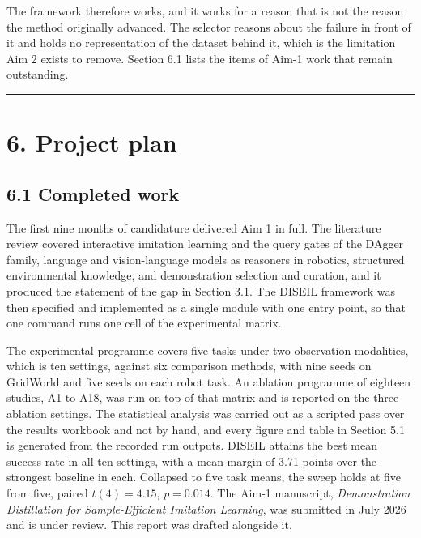 \documentclass[
  11pt,
]{article}
\begin{document}
The framework therefore works, and it works for a reason that is not the
reason the method originally advanced. The selector reasons about the
failure in front of it and holds no representation of the dataset behind
it, which is the limitation Aim 2 exists to remove. Section 6.1 lists
the items of Aim-1 work that remain outstanding.

\begin{center}\rule{0.5\linewidth}{0.5pt}\end{center}

\hypertarget{project-plan}{%
\section{6. Project plan}\label{project-plan}}

\hypertarget{completed-work}{%
\subsection{6.1 Completed work}\label{completed-work}}

The first nine months of candidature delivered Aim 1 in full. The
literature review covered interactive imitation learning and the query
gates of the DAgger family, language and vision-language models as
reasoners in robotics, structured environmental knowledge, and
demonstration selection and curation, and it produced the statement of
the gap in Section 3.1. The DISEIL framework was then specified and
implemented as a single module with one entry point, so that one command
runs one cell of the experimental matrix.

The experimental programme covers five tasks under two observation
modalities, which is ten settings, against six comparison methods, with
nine seeds on GridWorld and five seeds on each robot task. An ablation
programme of eighteen studies, A1 to A18, was run on top of that matrix
and is reported on the three ablation settings. The statistical analysis
was carried out as a scripted pass over the results workbook and not by
hand, and every figure and table in Section 5.1 is generated from the
recorded run outputs. DISEIL attains the best mean success rate in all
ten settings, with a mean margin of 3.71 points over the strongest
baseline in each. Collapsed to five task means, the sweep holds at five
from five, paired \(t(4) = 4.15\), \(p = 0.014\). The Aim-1 manuscript,
\emph{Demonstration Distillation for Sample-Efficient Imitation
Learning}, was submitted in July 2026 and is under review. This report
was drafted alongside it.
\end{document}
